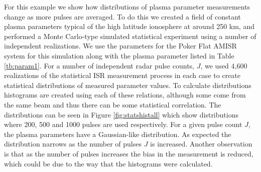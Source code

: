 \documentclass[draft,ras]{agutex}
\newcommand{\pcom}[2]{\marginpar{{\footnotesize \bf #1}}{\it {#2}}}
\begin{document}
\begin{article}
For this example we show how distributions of plasma parameter measurements change as more pulses are averaged. To do this we created a field of constant plasma parameters typical of the high latitude ionosphere at around 250 km, and performed a Monte Carlo-type simulated statistical experiment using a number of independent realizations. We use the parameters for the Poker Flat AMISR system for this simulation along with the plasma parameter listed in Table \ref{tb:param1}. For a number of independent radar pulse counts, $J$, we used 4,600 realizations of the statistical ISR measurement process in each case to create statistical distributions of measured parameter values. To calculate distributions histograms are created using each of these relations, although some come from the same beam and thus there can be some statistical correlation. The distributions can be seen in Figure \ref{fig:statshistall} which show distributions where 200, 500 and 1000 pulses are used respectively. For a given pulse count $J$, the plasma parameters have a Gaussian-like distribution. As expected the distribution narrows as the number of pulses $J$ is increased. Another observation is that as the number of pulses increases the bias in the measurement is reduced, which could be due to the way that the histograms were calculated.

\end{article}
\end{document}

